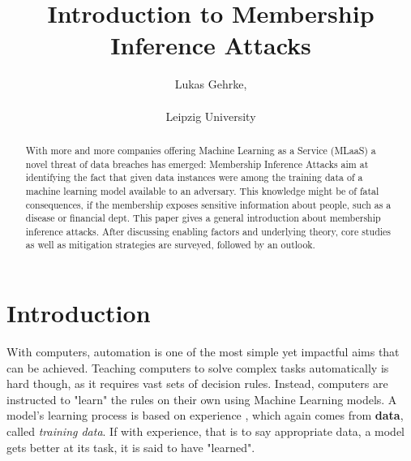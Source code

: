 \documentclass[runningheads]{llncs}
\begin{document}
%
\title{Introduction to Membership Inference Attacks}
%
%
\author{Lukas Gehrke, \\
 \\
Leipzig University \\
}
%
%
%

\maketitle
%

\tableofcontents
\newpage

\begin{abstract} 
    With more and more companies offering Machine Learning as a Service (MLaaS) a novel threat of data breaches has emerged: Membership Inference Attacks aim at identifying the fact that given data instances were among the training data of a machine learning model available to an adversary. This knowledge might be of fatal consequences, if the membership exposes sensitive information about people, such as a disease or financial dept. This paper gives a general introduction about membership inference attacks. After discussing enabling factors and underlying theory, core studies as well as mitigation strategies are surveyed, followed by an outlook.
    
\end{abstract}
%
%
%
\section{Introduction}

With computers, automation is one of the most simple yet impactful aims that can be achieved.
Teaching computers to solve complex tasks automatically is hard though, as it requires vast sets of decision rules. Instead, computers are instructed to "learn" the rules on their own using Machine Learning models. A model's learning process is based on experience \cite{mitchell1997machine}, which again comes from \textbf{data}, called \textit{training data}. If with experience, that is to say appropriate data, a model gets better at its task, it is said to have "learned".
\end{document}
